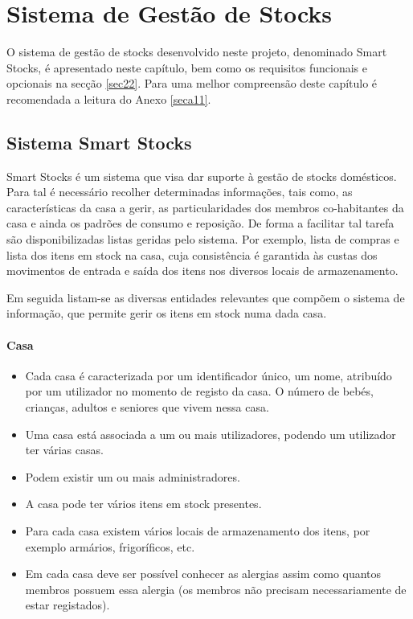 %
%
\chapter{Sistema de Gestão de Stocks} \label{cap2}

O sistema de gestão de stocks desenvolvido neste projeto, denominado Smart Stocks, é apresentado neste capítulo, bem como os requisitos funcionais e opcionais na secção \ref{sec22}. Para uma melhor compreensão deste capítulo é recomendada a leitura do Anexo \ref{seca11}.

%
%
\section{Sistema Smart Stocks} \label{sec21}
Smart Stocks é um sistema que visa dar suporte à gestão de stocks domésticos. Para tal é necessário recolher determinadas informações, tais como, as características da casa a gerir, as particularidades dos membros co-habitantes da casa e ainda os padrões de consumo e reposição. De forma a facilitar tal tarefa são disponibilizadas listas geridas pelo sistema. Por exemplo, lista de compras e lista dos itens em stock na casa, cuja consistência é garantida às custas dos movimentos de entrada e saída dos itens nos diversos locais de armazenamento.

Em seguida listam-se as diversas entidades relevantes que compõem o sistema de informação, que permite gerir os itens em stock numa dada casa.
\subsubsection{Casa}
\begin{itemize}
	\item Cada casa é caracterizada por um identificador único, um nome, atribuído por um utilizador no momento de registo da casa. O número de bebés, crianças, adultos e seniores que vivem nessa casa.
	\item Uma casa está associada a um ou mais utilizadores, podendo um utilizador ter várias casas. 
	\item Podem existir um ou mais administradores.
	\item A casa pode ter vários itens em stock presentes.
	\item Para cada casa existem vários locais de armazenamento dos itens, por exemplo armários, frigoríficos, etc.
	\item Em cada casa deve ser possível conhecer as alergias assim como quantos membros possuem essa alergia (os membros não precisam necessariamente de estar registados).
\end{itemize}

